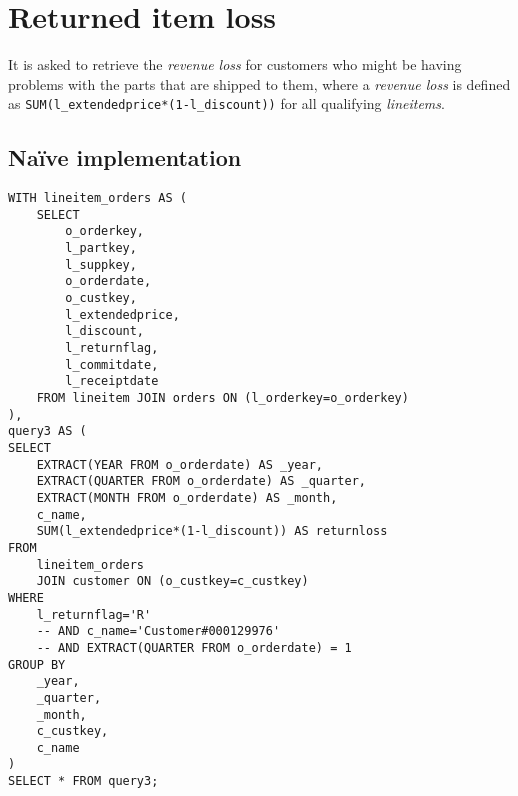 

\section{Returned item loss}

It is asked to retrieve the \textit{revenue loss} for customers who might be having problems with the parts that are shipped to them, where a \textit{revenue loss} is defined as \texttt{SUM(l\_extendedprice*(1-l\_discount))} for all qualifying \textit{lineitems}.

\subsection{Na\"{i}ve implementation}

\begin{lstlisting}
WITH lineitem_orders AS (
	SELECT 
		o_orderkey, 
		l_partkey, 
		l_suppkey, 
		o_orderdate, 
		o_custkey, 
		l_extendedprice, 
		l_discount, 
		l_returnflag,
		l_commitdate,
		l_receiptdate
	FROM lineitem JOIN orders ON (l_orderkey=o_orderkey)
),
query3 AS (
SELECT
	EXTRACT(YEAR FROM o_orderdate) AS _year,
	EXTRACT(QUARTER FROM o_orderdate) AS _quarter,
	EXTRACT(MONTH FROM o_orderdate) AS _month,
	c_name,
	SUM(l_extendedprice*(1-l_discount)) AS returnloss
FROM
	lineitem_orders
	JOIN customer ON (o_custkey=c_custkey)
WHERE 
	l_returnflag='R'
	-- AND c_name='Customer#000129976'
	-- AND EXTRACT(QUARTER FROM o_orderdate) = 1
GROUP BY
	_year,
	_quarter,
	_month,
	c_custkey,
	c_name
)
SELECT * FROM query3;
\end{lstlisting}
